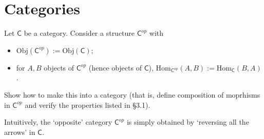 \documentclass[../../master.tex]{subfiles}
\begin{document}
\section{Categories}

  \begin{problem}
    Let \(\mathsf{C}\) be a category. Consider a structure \(\mathsf{C}^{op}\) with
    \begin{itemize}
      \item \(\text{Obj}(\mathsf{C}^{op}) := \text{Obj}(\mathsf{C})\);
      \item for \(A, B\) objects of \(\mathsf{C}^{op}\) (hence objects of \(\mathsf{C}\)),
      \(\text{Hom}_{\mathsf{C}^{op}} (A, B) := \text{Hom}_{\mathsf{C}}(B, A)\).
    \end{itemize}
    Show how to make this into a category (that is, define composition of moprhisms in \(\mathsf{C}^{op}\) and verify the properties listed in \S 3.1).

    Intuitively, the `opposite' category \(\mathsf{C}^{op}\) is simply obtained by `reversing all the arrows' in \(\mathsf{C}\).
  \end{problem}
\end{document}
